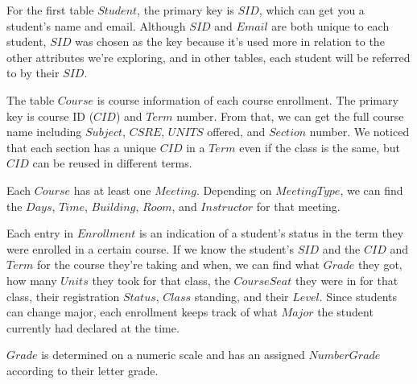 
For the first table $Student$, the primary key is $SID$, which can get you a student's name and email. Although $SID$ and $Email$ are both unique to each student, $SID$ was chosen as the key because it's used more in relation to the other attributes we're exploring, and in other tables, each student will be referred to by their $SID$.

The table $Course$ is course information of each course enrollment. The primary key is course ID ($CID$) and $Term$ number. From that, we can get the full course name including $Subject$, $CSRE$, $UNITS$ offered, and $Section$ number. We noticed that each section has a unique $CID$ in a $Term$ even if the class is the same, but $CID$ can be reused in different terms.

Each $Course$ has at least one $Meeting$. Depending on $Meeting Type$, we can find the $Days$, $Time$, $Building$, $Room$, and $Instructor$ for that meeting.

Each entry in $Enrollment$ is an indication of a student's status in the term they were enrolled in a certain course. If we know the student's $SID$ and the $CID$ and $Term$ for the course they're taking and when, we can find what $Grade$ they got, how many $Units$ they took for that class, the $Course Seat$ they were in for that class, their registration $Status$, $Class$ standing, and their $Level$. Since students can change major, each enrollment keeps track of what $Major$ the student currently had declared at the time.

$Grade$ is determined on a numeric scale and has an assigned $Number Grade$ according to their letter grade.